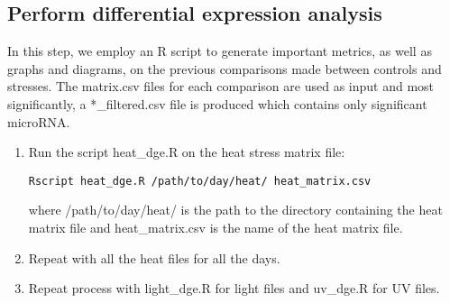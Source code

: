 \documentclass[12pt,titlepage]{article}
\begin{document}
\subsection{Perform differential expression analysis}
In this step, we employ an R script to generate important metrics, as well as graphs and diagrams, on the previous comparisons made between controls and stresses. The matrix.csv files for each comparison are used as input and most significantly, a *\_filtered.csv file is produced which contains only significant microRNA.
\begin{enumerate}
\item Run the script heat\_dge.R on the heat stress matrix file:
\begin{tcolorbox}
\begin{lstlisting}
Rscript heat_dge.R /path/to/day/heat/ heat_matrix.csv 
\end{lstlisting}
\end{tcolorbox} 
where /path/to/day/heat/ is the path to the directory containing the heat matrix file and heat\_matrix.csv is the name of the heat matrix file.
\item Repeat with all the heat files for all the days.
\item Repeat process with light\_dge.R for light files and uv\_dge.R for UV files.
\end{enumerate}
\end{document}
